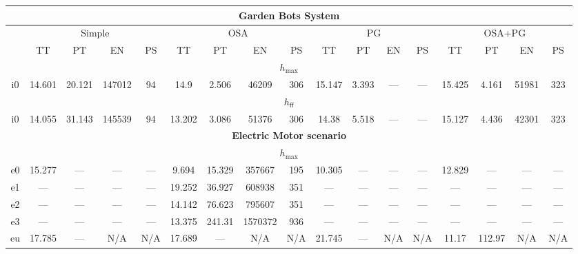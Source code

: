 \begin{tabular}{|c|c|c|c|c|c|c|c|c|c|c|c|c|c|c|c|c|}%
\multicolumn{17}{c}{\textbf{Garden Bots System}}\\%
\hline%
&\multicolumn{4}{|c|}{\small{Simple}}&\multicolumn{4}{|c|}{\small{OSA}}&\multicolumn{4}{|c|}{\small{PG}}&\multicolumn{4}{|c|}{\small{OSA+PG}}\\%
\hline%
&\small{TT}&\small{PT}&\small{EN}&\small{PS}&\small{TT}&\small{PT}&\small{EN}&\small{PS}&\small{TT}&\small{PT}&\small{EN}&\small{PS}&\small{TT}&\small{PT}&\small{EN}&\small{PS}\\%
\hline%
\multicolumn{17}{|c|}{$h_{\max}$}\\%
\hline%
i0&\small{14.601}&\small{20.121}&\small{147012}&\small{94}&\small{14.9}&\small{2.506}&\small{46209}&\small{306}&\small{15.147}&\small{3.393}&\small{---}&\small{---}&\small{15.425}&\small{4.161}&\small{51981}&\small{323}\\%
\hline%
\multicolumn{17}{|c|}{$h_{\mathsf{ff}}$}\\%
\hline%
i0&\small{14.055}&\small{31.143}&\small{145539}&\small{94}&\small{13.202}&\small{3.086}&\small{51376}&\small{306}&\small{14.38}&\small{5.518}&\small{---}&\small{---}&\small{15.127}&\small{4.436}&\small{42301}&\small{323}\\%
\hline%
\multicolumn{17}{c}{\textbf{Electric Motor scenario}}\\%
\hline%
\multicolumn{17}{|c|}{$h_{\max}$}\\%
\hline%
e0&\small{15.277}&\small{---}&\small{---}&\small{---}&\small{9.694}&\small{15.329}&\small{357667}&\small{195}&\small{10.305}&\small{---}&\small{---}&\small{---}&\small{12.829}&\small{---}&\small{---}&\small{---}\\%
\hline%
e1&\small{---}&\small{---}&\small{---}&\small{---}&\small{19.252}&\small{36.927}&\small{608938}&\small{351}&\small{---}&\small{---}&\small{---}&\small{---}&\small{---}&\small{---}&\small{---}&\small{---}\\%
\hline%
e2&\small{---}&\small{---}&\small{---}&\small{---}&\small{14.142}&\small{76.623}&\small{795607}&\small{351}&\small{---}&\small{---}&\small{---}&\small{---}&\small{---}&\small{---}&\small{---}&\small{---}\\%
\hline%
e3&\small{---}&\small{---}&\small{---}&\small{---}&\small{13.375}&\small{241.31}&\small{1570372}&\small{936}&\small{---}&\small{---}&\small{---}&\small{---}&\small{---}&\small{---}&\small{---}&\small{---}\\%
\hline%
eu&\small{17.785}&\small{---}&\small{N/A}&\small{N/A}&\small{17.689}&\small{---}&\small{N/A}&\small{N/A}&\small{21.745}&\small{---}&\small{N/A}&\small{N/A}&\small{11.17}&\small{112.97}&\small{N/A}&\small{N/A}\\%

\end{tabular}
